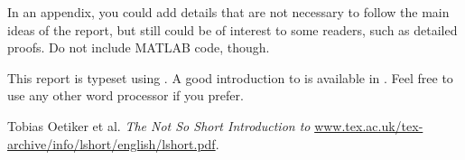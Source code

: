 \documentclass[a4paper,twocolumn]{article}
\begin{document}
In an appendix, you could add details that are not necessary to follow
the main ideas of the report, but still could be of interest to some
readers, such as detailed proofs. Do not include MATLAB code, though.

This report is typeset using \LaTeXe. A good introduction to \LaTeXe
is available in \cite{latexmanual}. Feel free to use any other word
processor if you prefer.

%

\begin{thebibliography}{99}
 Tobias Oetiker et al. \textsl{The Not So Short
    Introduction to
    \LaTeXe}
    \url{www.tex.ac.uk/tex-archive/info/lshort/english/lshort.pdf}.
\end{thebibliography}
\end{document}
